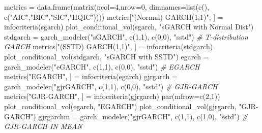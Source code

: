 \documentclass[
  11pt,
]{article}
\newenvironment{Shaded}{\begin{snugshade}}{\end{snugshade}}
\newcommand{\AttributeTok}[1]{\textcolor[rgb]{0.77,0.63,0.00}{#1}}
\newcommand{\CommentTok}[1]{\textcolor[rgb]{0.56,0.35,0.01}{\textit{#1}}}
\newcommand{\DecValTok}[1]{\textcolor[rgb]{0.00,0.00,0.81}{#1}}
\newcommand{\FunctionTok}[1]{\textcolor[rgb]{0.00,0.00,0.00}{#1}}
\newcommand{\NormalTok}[1]{#1}
\newcommand{\OtherTok}[1]{\textcolor[rgb]{0.56,0.35,0.01}{#1}}
\newcommand{\StringTok}[1]{\textcolor[rgb]{0.31,0.60,0.02}{#1}}
\begin{document}
\begin{Shaded}
\begin{Highlighting}[]
\NormalTok{metrics }\OtherTok{=} \FunctionTok{data.frame}\NormalTok{(}\FunctionTok{matrix}\NormalTok{(}\AttributeTok{ncol=}\DecValTok{4}\NormalTok{,}\AttributeTok{nrow=}\DecValTok{0}\NormalTok{, }\AttributeTok{dimnames=}\FunctionTok{list}\NormalTok{(}\FunctionTok{c}\NormalTok{(), }\FunctionTok{c}\NormalTok{(}\StringTok{"AIC"}\NormalTok{,}\StringTok{"BIC"}\NormalTok{,}\StringTok{"SIC"}\NormalTok{,}\StringTok{"HQIC"}\NormalTok{))))}
\NormalTok{metrics[}\StringTok{"(Normal) GARCH(1,1)"}\NormalTok{, ] }\OtherTok{=}  \FunctionTok{infocriteria}\NormalTok{(sgarch)}
\FunctionTok{plot\_conditional\_vol}\NormalTok{(sgarch, }\StringTok{"sGARCH with Normal Dist"}\NormalTok{)}
\NormalTok{stdgarch }\OtherTok{=}  \FunctionTok{garch\_modeler}\NormalTok{(}\StringTok{"sGARCH"}\NormalTok{, }\FunctionTok{c}\NormalTok{(}\DecValTok{1}\NormalTok{,}\DecValTok{1}\NormalTok{), }\FunctionTok{c}\NormalTok{(}\DecValTok{0}\NormalTok{,}\DecValTok{0}\NormalTok{), }\StringTok{"sstd"}\NormalTok{) }\CommentTok{\# T{-}distribution GARCH}
\NormalTok{metrics[}\StringTok{"(SSTD) GARCH(1,1)"}\NormalTok{, ] }\OtherTok{=}  \FunctionTok{infocriteria}\NormalTok{(stdgarch)}
\FunctionTok{plot\_conditional\_vol}\NormalTok{(stdgarch, }\StringTok{"sGARCH with SSTD"}\NormalTok{)}
\NormalTok{egarch }\OtherTok{=}  \FunctionTok{garch\_modeler}\NormalTok{(}\StringTok{"eGARCH"}\NormalTok{, }\FunctionTok{c}\NormalTok{(}\DecValTok{1}\NormalTok{,}\DecValTok{1}\NormalTok{), }\FunctionTok{c}\NormalTok{(}\DecValTok{0}\NormalTok{,}\DecValTok{0}\NormalTok{), }\StringTok{"sstd"}\NormalTok{) }\CommentTok{\# EGARCH}
\NormalTok{metrics[}\StringTok{"EGARCH"}\NormalTok{, ] }\OtherTok{=}  \FunctionTok{infocriteria}\NormalTok{(egarch)}
\NormalTok{gjrgarch }\OtherTok{=}  \FunctionTok{garch\_modeler}\NormalTok{(}\StringTok{"gjrGARCH"}\NormalTok{, }\FunctionTok{c}\NormalTok{(}\DecValTok{1}\NormalTok{,}\DecValTok{1}\NormalTok{), }\FunctionTok{c}\NormalTok{(}\DecValTok{0}\NormalTok{,}\DecValTok{0}\NormalTok{), }\StringTok{"sstd"}\NormalTok{) }\CommentTok{\# GJR{-}GARCH}
\NormalTok{metrics[}\StringTok{"GJR{-}GARCH"}\NormalTok{, ] }\OtherTok{=}  \FunctionTok{infocriteria}\NormalTok{(gjrgarch)}
\FunctionTok{par}\NormalTok{(}\AttributeTok{mfrow=}\FunctionTok{c}\NormalTok{(}\DecValTok{2}\NormalTok{,}\DecValTok{1}\NormalTok{))}
\FunctionTok{plot\_conditional\_vol}\NormalTok{(egarch, }\StringTok{"EGARCH"}\NormalTok{)}
\FunctionTok{plot\_conditional\_vol}\NormalTok{(gjrgarch, }\StringTok{"GJR{-}GARCH"}\NormalTok{)}
\NormalTok{gjrgarchm }\OtherTok{=}  \FunctionTok{garch\_modeler}\NormalTok{(}\StringTok{"gjrGARCH"}\NormalTok{, }\FunctionTok{c}\NormalTok{(}\DecValTok{1}\NormalTok{,}\DecValTok{1}\NormalTok{), }\FunctionTok{c}\NormalTok{(}\DecValTok{1}\NormalTok{,}\DecValTok{0}\NormalTok{), }\StringTok{"sstd"}\NormalTok{) }\CommentTok{\# GJR{-}GARCH IN MEAN}

\end{Highlighting}
\end{Shaded}
\end{document}
